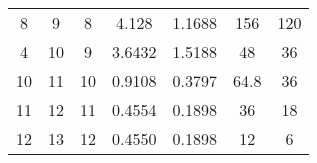 \begin{table}[]
\begin{tabular}{@{}ccccccc@{}}
8                                                            & 9                                                               & 8                                                    & 4.128                                                                           & 1.1688                                                                        & 156                                                                             & 120                                                                                  \\
4                                                            & 10                                                              & 9                                                    & 3.6432                                                                          & 1.5188                                                                        & 48                                                                              & 36                                                                                   \\
10                                                           & 11                                                              & 10                                                   & 0.9108                                                                          & 0.3797                                                                        & 64.8                                                                            & 36                                                                                   \\
11                                                           & 12                                                              & 11                                                   & 0.4554                                                                          & 0.1898                                                                        & 36                                                                              & 18                                                                                   \\
12                                                           & 13                                                              & 12                                                   & 0.4550                                                                          & 0.1898                                                                        & 12                                                                              & 6                                                                                    \\

\end{tabular}
\end{table}
